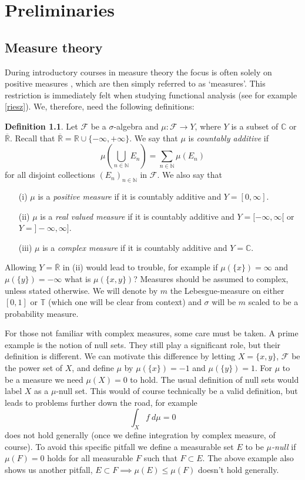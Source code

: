 \documentclass[a4paper,12pt,twoside,BCOR=10mm]{scrbook}
\theoremstyle{definition}
\theoremstyle{definition}
\theoremstyle{definition}
\newtheorem{definition}[theorem]{Definition}
\begin{document}
\chapter{Preliminaries}
\section{Measure theory}
During introductory courses in measure theory the focus is often solely on positive measures \citep{tao}, which are then simply referred to as `measures'.
This restriction is immediately felt when studying functional analysis (see for example \ref{riesz}).
We, therefore, need the following definitions:
\begin{definition}
Let $\mathcal{F}$ be a $\sigma$-algebra and $\mu: \mathcal{F} \rightarrow Y$, where $Y$ is a subset of $\mathbb{C}$ or $\overline{\mathbb{R}}$.
Recall that $\overline{\mathbb{R}} = \mathbb{R} \cup \{-\infty, +\infty\}$.
We say that $\mu$ is \emph{countably additive} if
\[
	\mu\left( \bigcup_{n \in \mathbb{N}} E_n \right ) = \sum_{n \in \mathbb{N}} \mu(E_n)
\]
for all disjoint collections $(E_n)_{n \in \mathbb{N}}$ in $\mathcal{F}$.
We also say that
\begin{enumerate}
\item[(i)] $\mu$ is a \emph{positive measure} if it is countably additive and $Y = [0, \infty]$.
\item[(ii)] $\mu$ is a \emph{real valued measure} if it is countably additive and $Y = [-\infty, \infty[$ or $Y = ]-\infty, \infty]$.
\item[(iii)] $\mu$ is a \emph{complex measure} if it is countably additive and $Y = \mathbb{C}$.
\end{enumerate}
\end{definition}
Allowing $Y = \overline{\mathbb{R}}$ in (ii) would lead to trouble, for example if $\mu(\{x\}) = \infty$ and $\mu(\{y\}) = -\infty$ what is $\mu(\{x, y\})$?
Measures should be assumed to complex, unless stated otherwise.
We will denote by $m$ the Lebesgue-measure on either $[0, 1]$ or $\mathbb{T}$ (which one will be clear from context) and $\sigma$ will be $m$ scaled to be a probability measure.

For those not familiar with complex measures, some care must be taken.
A prime example is the notion of null sets.
They still play a significant role, but their definition is different.
We can motivate this difference by letting $X = \{x, y\}$, $\mathcal{F}$ be the power set of $X$, and define $\mu$ by $\mu(\{x\}) = -1$ and $\mu(\{y\}) = 1$.
For $\mu$ to be a measure we need $\mu(X) = 0$ to hold.
The usual definition of null sets would label $X$ as a $\mu$-null set.
This would of course technically be a valid definition, but leads to problems further down the road, for example
\[
	\int_X f\ d\mu = 0
\]
does not hold generally (once we define integration by complex measure, of course).
To avoid this specific pitfall we define a measurable set $E$ to be \emph{$\mu$-null} if $\mu(F) = 0$ holds for all measurable $F$ such that $F \subset E$.
The above example also shows us another pitfall, $E \subset F \implies \mu(E) \leq \mu(F)$ doesn't hold generally.
\end{document}
